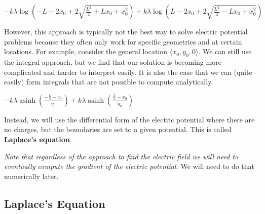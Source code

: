\(\displaystyle - k \lambda \log{\left(- L - 2 x_{0} + 2 \sqrt{\frac{L^{2}}{4} + L x_{0} + x_{0}^{2}} \right)} + k \lambda \log{\left(L - 2 x_{0} + 2 \sqrt{\frac{L^{2}}{4} - L x_{0} + x_{0}^{2}} \right)}\)

However, this approach is typically not the best way to solve electric
potential problems because they often only work for specific geometries
and at certain locations. For example, consider the general location
\(\langle x_0,y_0,0 \rangle\). We can still use the integral approach,
but we find that our solution is becoming more complicated and harder to
interpret easily. It is also the case that we can (quite easily) form
integrals that are not possible to compute analytically.

\begin{Shaded}
\begin{Highlighting}[]
\OperatorTok{=}\NormalTok{)}

\OperatorTok{=}\OperatorTok{*}\OperatorTok{/}\OperatorTok{{-}}\OperatorTok{**}\OperatorTok{+}\OperatorTok{**}\NormalTok{)}

\OperatorTok{=}

\end{Highlighting}
\end{Shaded}

\(\displaystyle - k \lambda \operatorname{asinh}{\left(\frac{- \frac{L}{2} - x_{0}}{y_{0}} \right)} + k \lambda \operatorname{asinh}{\left(\frac{\frac{L}{2} - x_{0}}{y_{0}} \right)}\)

Instead, we will use the differential form of the electric potential
where there are no charges, but the boundaries are set to a given
potential. This is called \textbf{Laplace's equation}.

\emph{Note that regardless of the approach to find the electric field we
will need to eventually compute the gradient of the electric potential.}
We will need to do that numerically later.

\subsection{Laplace's Equation}\label{laplaces-equation}

